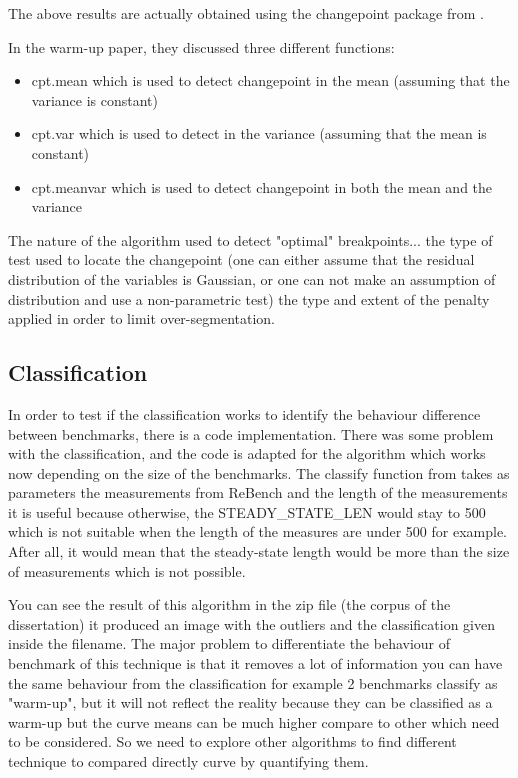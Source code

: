 \documentclass[12pt,a4paper]{article}
\begin{document}
The above results are actually obtained using the changepoint package from \citep{killick2014changepoint}.

In the warm-up paper, they discussed three different functions:

\begin{itemize}
    \item cpt.mean which is used to detect changepoint in the mean (assuming that the variance is constant)
    \item cpt.var which is used to detect  in the variance (assuming that the mean is constant)
    \item cpt.meanvar which is used to detect changepoint in both the mean and the variance
\end{itemize}

The nature of the algorithm used to detect "optimal" breakpoints...
the type of test used to locate the changepoint (one can either assume that the residual distribution of the variables is Gaussian, or one can not make an assumption of distribution and use a non-parametric test)
the type and extent of the penalty applied in order to limit over-segmentation.

\subsection{Classification}

In order to test if the classification works to identify the behaviour difference between benchmarks, there is a code implementation.
There was some problem with the classification, and the code is adapted for the algorithm which works now depending on the size of the benchmarks.
The classify function from \citep{barrett2017virtual} takes as parameters the measurements from ReBench and the length of the measurements it is useful because otherwise, the STEADY\_STATE\_LEN would stay to 500 which is not suitable when the length of the measures are under 500 for example. After all, it would mean that the steady-state length would be more than the size of measurements which is not possible.


You can see the result of this algorithm in the zip file (the corpus of the dissertation) it produced an image with the outliers and the classification given inside the filename.
The major problem to differentiate the behaviour of benchmark of this technique is that it removes a lot of information you can have the same behaviour from the classification for example 2 benchmarks classify as "warm-up", but it will not reflect the reality because they can be classified as a warm-up but the curve means can be much higher compare to other which need to be considered. So we need to explore other algorithms to find different technique to compared directly curve by quantifying them.
\end{document}
